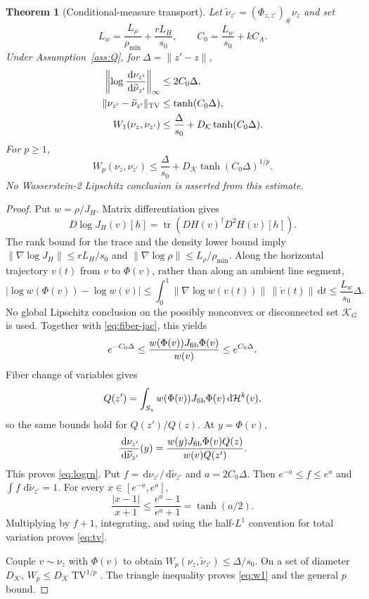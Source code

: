 \documentclass[11pt]{article}
\newtheorem{theorem}{Theorem}[section]
\theoremstyle{definition}
\newcommand{\TV}{\operatorname{TV}}
\newcommand{\dd}{\,\mathrm d}
\begin{document}
\begin{theorem}[Conditional-measure transport]\label{thm:measure-transport}
Let $\widetilde\nu_{z'}=(\Phi_{z,z'})_\#\nu_z$ and set
\[
 L_w=\frac{L_\rho}{\rho_{\min}}+\frac{rL_H}{s_0},
 \qquad C_0=\frac{L_w}{s_0}+kC_A.
\]
Under Assumption~\ref{ass:Q}, for $\Delta=\|z'-z\|$,
\begin{align}
 \left\|\log\frac{\dd\nu_{z'}}{\dd\widetilde\nu_{z'}}\right\|_\infty
 &\le2C_0\Delta,\label{eq:logrn}\\
 \|\nu_{z'}-\widetilde\nu_{z'}\|_{\rm TV}
 &\le\tanh(C_0\Delta),\label{eq:tv}\\
 W_1(\nu_z,\nu_{z'})
 &\le\frac{\Delta}{s_0}
 +D_{\mathcal K}\tanh(C_0\Delta).\label{eq:w1}
\end{align}
For $p\ge1$,
\[
 W_p(\nu_z,\nu_{z'})\le\frac{\Delta}{s_0}
 +D_{\mathcal K}\tanh(C_0\Delta)^{1/p}.
\]
No Wasserstein-2 Lipschitz conclusion is asserted from this estimate.
\end{theorem}

\begin{proof}
Put $w=\rho/J_H$.  Matrix differentiation gives
\[
 D\log J_H(v)[h]
 =\operatorname{tr}(DH(v)^\dagger D^2H(v)[h]).
\]
The rank bound for the trace and the density lower bound imply
$\|\nabla\log J_H\|\le rL_H/s_0$ and
$\|\nabla\log\rho\|\le L_\rho/\rho_{\min}$.  Along the horizontal trajectory
$v(t)$ from $v$ to $\Phi(v)$, rather than along an ambient line segment,
\[
 \left|\log w(\Phi(v))-\log w(v)\right|
 \le\int_0^1\|\nabla\log w(v(t))\|\,\|\dot v(t)\|\dd t
 \le \frac{L_w}{s_0}\Delta.
\]
No global Lipschitz conclusion on the possibly nonconvex or disconnected set
$\mathcal K_G$ is used.  Together with \eqref{eq:fiber-jac}, this yields
\[
 e^{-C_0\Delta}
 \le\frac{w(\Phi(v))J_{\rm fib}\Phi(v)}{w(v)}
 \le e^{C_0\Delta}.
\]
Fiber change of variables gives
\[
 Q(z')=\int_{S_z}w(\Phi(v))J_{\rm fib}\Phi(v)\dd\mathcal H^k(v),
\]
so the same bounds hold for $Q(z')/Q(z)$.  At $y=\Phi(v)$,
\[
 \frac{\dd\nu_{z'}}{\dd\widetilde\nu_{z'}}(y)
 =\frac{w(y)J_{\rm fib}\Phi(v)Q(z)}{w(v)Q(z')}.
\]
This proves \eqref{eq:logrn}.  Put
$f=\dd\nu_{z'}/\dd\widetilde\nu_{z'}$ and $a=2C_0\Delta$.  Then
$e^{-a}\le f\le e^a$ and $\int f\,\dd\widetilde\nu_{z'}=1$.  For every
$x\in[e^{-a},e^a]$,
\[
 \frac{|x-1|}{x+1}\le\frac{e^a-1}{e^a+1}=\tanh(a/2).
\]
Multiplying by $f+1$, integrating, and using the half-$L^1$ convention for
total variation proves \eqref{eq:tv}.

Couple $v\sim\nu_z$ with $\Phi(v)$ to obtain
$W_p(\nu_z,\widetilde\nu_{z'})\le\Delta/s_0$.  On a set of diameter
$D_{\mathcal K}$, $W_p\le D_{\mathcal K}\TV^{1/p}$.  The triangle inequality
proves \eqref{eq:w1} and the general $p$ bound.
\end{proof}
\end{document}
